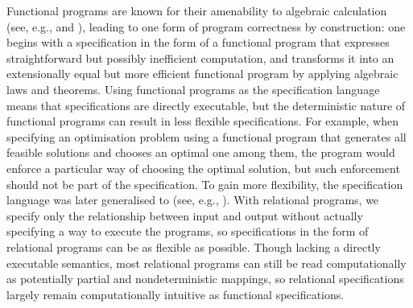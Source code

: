 Functional programs are known for their amenability to algebraic calculation (see, e.g., \citet{Backus-liberated} and \citet{Bird-pearls}), leading to one form of program correctness by construction: one begins with a specification in the form of a functional program that expresses straightforward but possibly inefficient computation, and transforms it into an extensionally equal but more efficient functional program by applying algebraic laws and theorems.
Using functional programs as the specification language means that specifications are directly executable, but the deterministic nature of functional programs can result in less flexible specifications.
For example, when specifying an optimisation problem using a functional program that generates all feasible solutions and chooses an optimal one among them, the program would enforce a particular way of choosing the optimal solution, but such enforcement should not be part of the specification.
To gain more flexibility, the specification language was later generalised to  (see, e.g., \citet{Bird-functional-algorithm-design}).
With relational programs, we specify only the relationship between input and output without actually specifying a way to execute the programs, so specifications in the form of relational programs can be as flexible as possible.
Though lacking a directly executable semantics, most relational programs can still be read computationally as potentially partial and nondeterministic mappings, so relational specifications largely remain computationally intuitive as functional specifications.

